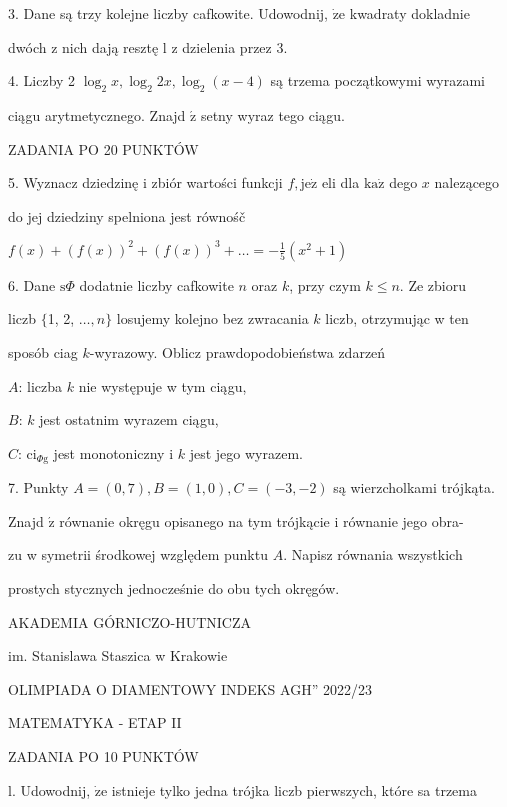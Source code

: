 \documentclass[a4paper,12pt]{article}
\begin{document}
3. Dane są trzy kolejne liczby cafkowite. Udowodnij, $\dot{\mathrm{z}}\mathrm{e}$ kwadraty dokladnie

dwóch z nich dają resztę l z dzielenia przez 3.

4. Liczby 2 $\log_{2}x, \log_{2}2x, \log_{2}(x-4)$ są trzema początkowymi wyrazami

ciągu arytmetycznego. Znajd $\acute{\mathrm{z}}$ setny wyraz tego ciągu.

ZADANIA PO 20 PUNKTÓW

5. Wyznacz dziedzinę i zbiór wartości funkcji $f, \mathrm{j}\mathrm{e}\dot{\mathrm{z}}$ eli dla $\mathrm{k}\mathrm{a}\dot{\mathrm{z}}$ dego $x$ nalezącego

do jej dziedziny spelniona jest równośč

$f(x)+(f(x))^{2}+(f(x))^{3}+\displaystyle \ldots=-\frac{1}{5}(x^{2}+1)$

6. Dane $\mathrm{s}\Phi$ dodatnie liczby cafkowite $n$ oraz $k$, przy czym $k \leq n$. Ze zbioru

liczb $\{$1, 2, $\ldots, n\}$ losujemy kolejno bez zwracania $k$ liczb, otrzymując w ten

sposób ciag $k$-wyrazowy. Oblicz prawdopodobieństwa zdarzeń

$A$: liczba $k$ nie występuje w tym ciągu,

$B$: $k$ jest ostatnim wyrazem ciągu,

$C$: $\mathrm{c}\mathrm{i}_{\Phi \mathrm{g}}$ jest monotoniczny i $k$ jest jego wyrazem.

7. Punkty $A = (0,7), B = (1,0), C = (-3,-2)$ są wierzcholkami trójkąta.

Znajd $\acute{\mathrm{z}}$ równanie okręgu opisanego na tym trójkącie i równanie jego obra-

zu w symetrii środkowej względem punktu $A$. Napisz równania wszystkich

prostych stycznych jednocześnie do obu tych okręgów.






AKADEMIA GÓRNICZO-HUTNICZA

im. Stanislawa Staszica w Krakowie

OLIMPIADA O DIAMENTOWY INDEKS AGH'' 2022/23

MATEMATYKA - ETAP II

ZADANIA PO 10 PUNKTÓW

l. Udowodnij, $\dot{\mathrm{z}}\mathrm{e}$ istnieje tylko jedna trójka liczb pierwszych, które sa trzema
\end{document}
